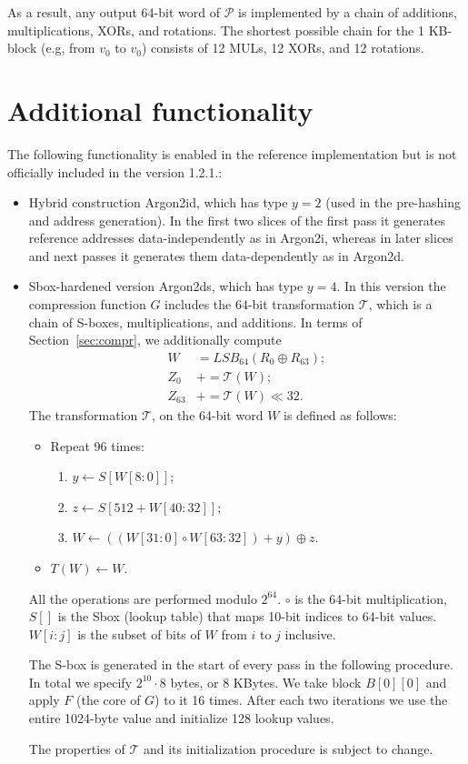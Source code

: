 \documentclass[a4paper]{article}
\begin{document}
As a result, any output 64-bit word of  $\mathcal{P}$  is implemented by a chain of additions, multiplications, XORs, and rotations. The shortest possible chain for the 1 KB-block (e.g, from $v_0$  to $v_0$) consists of 12 MULs, 12 XORs, and 12 rotations.

\section{Additional functionality}

The following functionality is enabled in the reference implementation but is 
not officially included in the version 1.2.1.:
\begin{itemize}
\item Hybrid construction \textsf{Argon2id}, which has type $y=2$ (used in the pre-hashing and address generation). In the first two slices of the first pass it generates reference addresses data-independently as in \textsf{Argon2i}, whereas in later slices and next passes it generates them data-dependently as in \textsf{Argon2d}.
\item Sbox-hardened version \textsf{Argon2ds}, which has type $y=4$. In this version the compression function $G$ includes the 64-bit transformation $\mathcal{T}$, which is a chain of S-boxes, multiplications, and additions. In terms of Section~\ref{sec:compr}, we additionally compute 
\begin{align*}
W&= LSB_{64}(R_0\oplus R_{63});\\
Z_0 &+= \mathcal{T}(W);\\
Z_{63}&+=\mathcal{T}(W)\ll 32.
\end{align*}
The transformation $\mathcal{T}$, on the 64-bit word $W$  is defined as follows:
\begin{itemize}
\item Repeat 96 times:
\begin{enumerate}
\item $y\leftarrow S[W[8:0]]$;
\item $z\leftarrow S[512+W[40:32]]$;
\item $W \leftarrow ((W[31:0]\circ W[63:32])+y)\oplus z$.
\end{enumerate}
\item $T(W)\leftarrow W$.
\end{itemize}
All the operations are performed modulo $2^{64}$. $\circ$ is the 64-bit multiplication, $S[]$ is the Sbox (lookup table) that maps 10-bit indices to 64-bit values. $W[i:j]$ is the subset of bits of $W$ from $i$ to $j$ inclusive. 

The S-box is generated in the start of every  pass in the following procedure. In total we specify $2^{10}\cdot 8$ bytes, or 8 KBytes. We take block $B[0][0]$ and apply $F$ (the core of $G$) to it 16 times. After each two iterations we use the entire 1024-byte value and initialize 128 lookup values.

The properties of $\mathcal{T}$ and its initialization procedure is subject to change.
\end{itemize}
\end{document}

